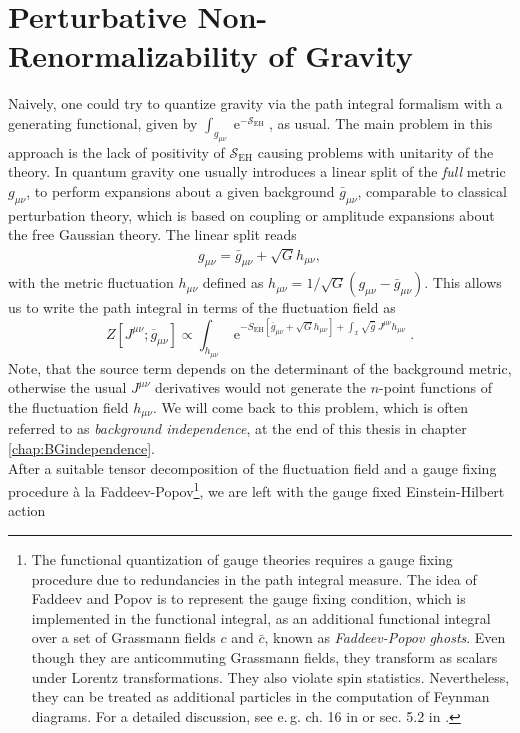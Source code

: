 \section{Perturbative Non-Renormalizability of Gravity}
Naively, one could try to quantize gravity via the path integral formalism with a generating functional, given by $\int_{g_{\mu\nu}} \operatorname{e}^{-\mathcal{S}_{\mathrm{EH}}}$, as usual. The main problem in this approach is the lack of positivity of $\mathcal{S}_{\mathrm{EH}}$ causing problems with unitarity of the theory. In quantum gravity one usually introduces a linear split of the \textit{full} metric $g_{\mu\nu}$, to perform expansions about a given background $\bar{g}_{\mu\nu}$, comparable to classical perturbation theory, which is based on coupling or amplitude expansions about the free Gaussian theory. The linear split reads
\begin{align}
	g_{\mu\nu} = \bar{g}_{\mu\nu} + \sqrt{G}h_{\mu\nu},
	\label{eqn:metric_split}
\end{align}
with the metric fluctuation $h_{\mu\nu}$ defined as $h_{\mu\nu}= 1/\sqrt{G}\left(g_{\mu\nu}-\bar{g}_{\mu\nu}\right)$. This allows us to write the path integral in terms of the fluctuation field as
\begin{equation}
Z\left[J^{\mu \nu} ; \overline{g}_{\mu \nu}\right] \propto \int_{h_{\mu \nu}} \operatorname{e}^{-S_{\mathrm{EH}}\left[\overline{g}_{\mu \nu}+\sqrt{G} h_{\mu \nu}\right]+\int_x \sqrt{\bar{g}} \  J^{\mu \nu} h_{\mu \nu}}.
\end{equation}
Note, that the source term depends on the determinant of the background metric, otherwise the usual $J^{\mu\nu}$ derivatives would not generate the $n$-point functions of the fluctuation field $h_{\mu\nu}$. We will come back to this problem, which is often referred to as \textit{background independence}, at the end of this thesis in chapter \ref{chap:BGindependence}. \\
After a suitable tensor decomposition of the fluctuation field and a gauge fixing procedure \`a la Faddeev-Popov\footnote{The functional quantization of gauge theories requires a gauge fixing procedure due to redundancies in the path integral measure. The idea of Faddeev and Popov is to represent the gauge fixing condition, which is implemented in the functional integral, as an additional functional integral over a set of Grassmann fields $c$ and $\bar{c}$, known as \textit{Faddeev-Popov ghosts}. Even though they are anticommuting Grassmann fields, they transform as scalars under Lorentz transformations. They also violate spin statistics. Nevertheless, they can be treated as additional particles in the computation of Feynman diagrams. For a detailed discussion, see e.\,g. ch. 16 in \cite{PeskinSchroeder1995} or  sec. 5.2 in \cite{PawlowskiNPgaugeLecture}.},  we are left with the gauge fixed Einstein-Hilbert action
